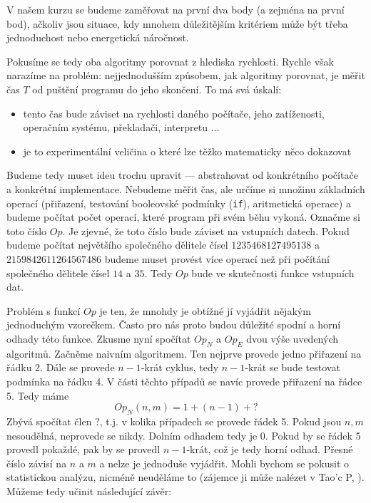 V našem kurzu se budeme zaměřovat na první dva body (a zejména na první bod), ačkoliv jsou situace, kdy mnohem důležitějším
kritériem může být třeba jednoduchost nebo energetická náročnost.  

Pokusíme se tedy oba algoritmy porovnat z hlediska rychlosti.  Rychle však narazíme na problém: nejjednodušším způsobem,
jak algoritmy porovnat, je měřit čas $T$ od puštění programu do jeho skončení. To má svá úskalí:

\begin{itemize}
 \item tento čas bude záviset na rychlosti daného počítače, jeho zatíženosti, operačním systému, překladači, interpretu ...
 \item je to experimentální veličina o které lze těžko matematicky něco dokazovat
\end{itemize}

Budeme tedy muset ideu trochu upravit --- abstrahovat od konkrétního počítače a konkrétní implementace. Nebudeme měřit čas, 
ale určíme si množinu základních operací (přiřazení, testování booleovské podmínky ({\tt if}), aritmetická operace) a budeme počítat 
počet operací,  které program při svém běhu vykoná. Označme si toto číslo $Op$. Je zjevné, že 
toto číslo bude záviset na vstupních datech. Pokud budeme počítat největšího společného dělitele čísel
$1235468127495138$ a $2159842611264567486$ budeme muset provést více operací než při počítání společného dělitele čísel
$14$ a $35$. Tedy $Op$ bude ve skutečnosti funkce vstupních dat.

Problém s funkcí $Op$ je ten, že mnohdy je obtížné jí vyjádřit nějakým jednoduchým vzorečkem. Často pro nás proto budou
důležité spodní a horní odhady této funkce. Zkusme nyní spočítat $Op_N$ a $Op_E$ dvou výše uvedených algoritmů. Začněme
naivním algoritmem. Ten nejprve provede jedno přiřazení na řádku 2. Dále se provede $n-1$-krát cyklus, tedy $n-1$-krát
se bude testovat podmínka na řádku 4. V části těchto případů se navíc provede přiřazení na řádce 5. Tedy máme
\begin{displaymath}
 Op_N(n,m) = 1 + (n-1) + ?
\end{displaymath}
Zbývá spočítat člen $?$, t.j. v kolika případech se provede řádek 5. Pokud jsou $n,m$ nesoudělná, neprovede se nikdy.
Dolním odhadem tedy je $0$. Pokud by se řádek 5 provedl pokaždé, pak by se provedl $n-1$-krát, což je tedy horní odhad.
Přesné číslo závisí na $n$ a $m$ a nelze je jednoduše vyjádřit. Mohli bychom se pokusit o statistickou analýzu, nicméně
neuděláme to (zájemce ji může nalézet v Tao'c P, \cite{TAOCP2}). Můžeme tedy učinit následující závěr:

